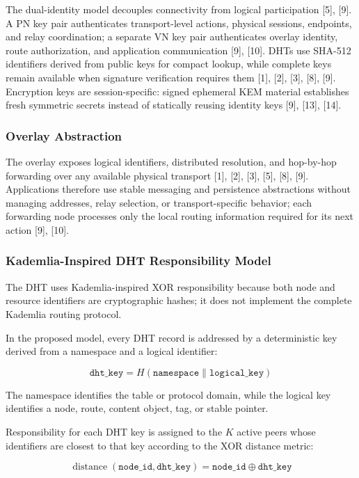 \documentclass[12pt]{article}
\begin{document}
The dual-identity model decouples connectivity from logical participation [5], [9]. A PN key pair authenticates transport-level actions, physical sessions, endpoints, and relay coordination; a separate VN key pair authenticates overlay identity, route authorization, and application communication [9], [10]. DHTs use SHA-512 identifiers derived from public keys for compact lookup, while complete keys remain available when signature verification requires them [1], [2], [3], [8], [9]. Encryption keys are session-specific: signed ephemeral KEM material establishes fresh symmetric secrets instead of statically reusing identity keys [9], [13], [14].

\subsubsection{Overlay Abstraction}

The overlay exposes logical identifiers, distributed resolution, and hop-by-hop forwarding over any available physical transport [1], [2], [3], [5], [8], [9]. Applications therefore use stable messaging and persistence abstractions without managing addresses, relay selection, or transport-specific behavior; each forwarding node processes only the local routing information required for its next action [9], [10].


\subsubsection{Kademlia-Inspired DHT Responsibility Model}

The DHT uses Kademlia-inspired XOR responsibility because both node and resource identifiers are cryptographic hashes; it does not implement the complete Kademlia routing protocol.

In the proposed model, every DHT record is addressed by a deterministic key derived
from a namespace and a logical identifier:

\[
\texttt{dht\_key} = H(\texttt{namespace} \parallel \texttt{logical\_key})
\]

The namespace identifies the table or protocol domain, while the logical key identifies a node, route, content object, tag, or stable pointer.

Responsibility for each DHT key is assigned to the \(K\) active peers whose
identifiers are closest to that key according to the XOR distance metric:

\[
\operatorname{distance}(\texttt{node\_id}, \texttt{dht\_key}) = \texttt{node\_id} \oplus \texttt{dht\_key}
\]
\end{document}
